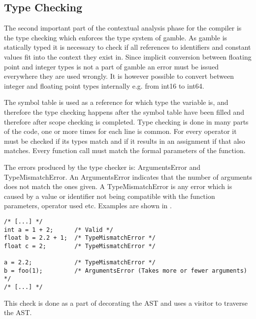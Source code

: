 \subsection*{Type Checking}
The second important part of the contextual analysis phase for the compiler is the type checking which enforces the type system of \gls{gamble}.
As \gls{gamble} is statically typed it is necessary to check if all references to identifiers and constant values fit into the context they exist in. 
Since implicit conversion between floating point and integer types is not a part of gamble an error must be issued everywhere they are used wrongly. 
It is however possible to convert between integer and floating point types internally e.g. from int16 to int64. 

The symbol table is used as a reference for which type the variable is, and therefore the type checking happens after the symbol table have been filled and therefore after scope checking is completed. 
Type checking is done in many parts of the code, one or more times for each line is common. 
For every operator it must be checked if its types match and if it results in an assignment if that also matches.
Every function call must match the formal parameters of the function. 

The errors produced by the type checker is: ArgumentsError and TypeMismatchError.
An ArgumentsError indicates that the number of arguments does not match the ones given.
A TypeMismatchError is any error which is caused by a value or identifier not being compatible with the function parameters, operator used etc.
Examples are shown in .

\begin{lstlisting}[caption=Examples of type errors in \gls{gamble},numbers=none,frame=tlrb,label={lst:typeErrors}]
/* [...] */
int a = 1 + 2;      /* Valid */
float b = 2.2 + 1;  /* TypeMismatchError */
float c = 2;        /* TypeMismatchError */ 

a = 2.2;            /* TypeMismatchError */
b = foo(1);         /* ArgumentsError (Takes more or fewer arguments) */ 
/* [...] */
\end{lstlisting}

This check is done as a part of decorating the AST and uses a visitor to traverse the AST. 